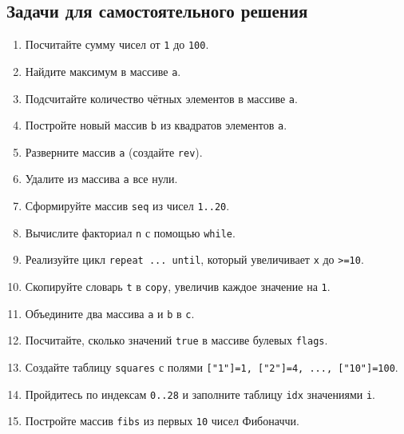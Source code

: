 \subsection*{Задачи для самостоятельного решения}
\begin{enumerate}
  \item Посчитайте сумму чисел от \verb|1| до \verb|100|.
  \item Найдите максимум в массиве \verb|a|.
  \item Подсчитайте количество чётных элементов в массиве \verb|a|.
  \item Постройте новый массив \verb|b| из квадратов элементов \verb|a|.
  \item Разверните массив \verb|a| (создайте \verb|rev|).
  \item Удалите из массива \verb|a| все нули.
  \item Сформируйте массив \verb|seq| из чисел \verb|1..20|.
  \item Вычислите факториал \verb|n| с помощью \verb|while|.
  \item Реализуйте цикл \verb|repeat ... until|, который увеличивает \verb|x| до \verb|>=10|.
  \item Скопируйте словарь \verb|t| в \verb|copy|, увеличив каждое значение на \verb|1|.
  \item Объедините два массива \verb|a| и \verb|b| в \verb|c|.
  \item Посчитайте, сколько значений \verb|true| в массиве булевых \verb|flags|.
  \item Создайте таблицу \verb|squares| с полями \verb|["1"]=1, ["2"]=4, ..., ["10"]=100|.
  \item Пройдитесь по индексам \verb|0..28| и заполните таблицу \verb|idx| значениями \verb|i|.
  \item Постройте массив \verb|fibs| из первых \verb|10| чисел Фибоначчи.
\end{enumerate}
